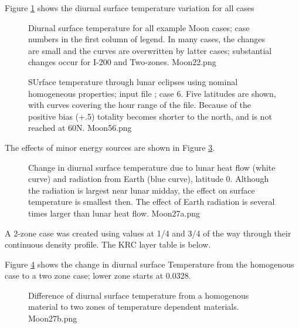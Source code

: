 \documentclass{article}
\begin{document}
Figure \ref{Moon22} shows the diurnal surface temperature variation for all cases
\begin{figure}[!ht] 
\caption[Moon models]{Diurnal surface temperature for all example Moon cases;
  case numbers in the first column of legend.  In many cases, the changes are
  small and the curves are overwritten by latter cases; substantial changes
  occur for I-200 and Two-zones.
\label{Moon22}  Moon22.png }
\end{figure} 
  

\begin{figure}[!ht] 
\caption[Earth Lunar eclipses]{ SUrface temperature through lunar eclipses using
  nominal homogeneous properties; input file ; case 6. Five latitudes
  are shown, with curves covering the hour range of the  file. Because
  of the positive bias (+.5) totality becomes shorter to the north, and is not
  reached at 60N.
\label{Moon56}  Moon56.png }
\end{figure} 

The effects of minor energy sources are shown in Figure \ref{Moon27a}.
  
\begin{figure}[!ht] 
\caption[Effect of heat flow and Earth radiation]{Change in diurnal surface
  temperature due to lunar heat flow (white curve) and radiation from Earth
  (blue curve), latitude 0. Although the radiation is largest near lunar midday,
  the effect on surface temperature is smallest then. The effect of Earth
  radiation is several times larger than lunar heat flow.
\label{Moon27a}  Moon27a.png }
\end{figure}  

 A 2-zone case was created using  values at 1/4 and 3/4 of the way through their continuous density profile. The KRC layer table is below. 

Figure \ref{Moon27b} shows the change in diurnal surface Temperature from the homogenous case to a two zone case; lower zone starts at  0.0328.
\begin{figure}[!ht] 
\caption[Effect of T-dependance]{Difference of diurnal surface temperature from a homogenous material to two zones of temperature dependent materials. 
\label{Moon27b}  Moon27b.png }
\end{figure} 
\end{document}
